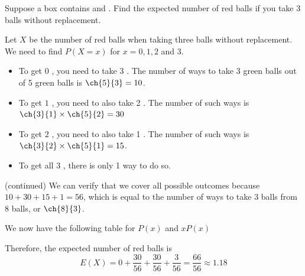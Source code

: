 \begin{frame}[t]
\begin{ex}
Suppose a box contains  and . Find the expected number of red balls if you take 3 balls without replacement.
\end{ex}
\begin{sol}
Let $X$ be the number of red balls when taking three balls without replacement. We need to find $P(X = x)$ for $x = 0,1,2$ and $3$. 
\begin{itemize}
\item To get $0$ , you need to take 3 . The number of ways to take 3 green balls out of 5 green balls is $\ch{5}{3} = 10$.
\item To get $1$ , you need to also take 2 . The number of such ways is $\ch{3}{1} \times \ch{5}{2} = 30$
\item To get $2$ , you need to also take 1 . The number of such ways is $\ch{3}{2} \times \ch{5}{1} = 15$.
\item To get all $3$ , there is only 1 way to do so.
\end{itemize}
\end{sol}
\end{frame}

\begin{frame}[t]
\begin{sol} (continued)
We can verify that we cover all possible outcomes because $10+30+15+1 = 56$, which is equal to the number of ways to take $3$ balls from $8$ balls, or $\ch{8}{3}$.

We now have the following table for $P(x)$ and $xP(x)$
\begin{table}[h!]
\end{table}
Therefore, the expected number of red balls is 
\[ E(X) = 0 + \frac{30}{56} + \frac{30}{56} + \frac{3}{56} = \frac{66}{56} \approx 1.18\]
\end{sol}
\end{frame}


